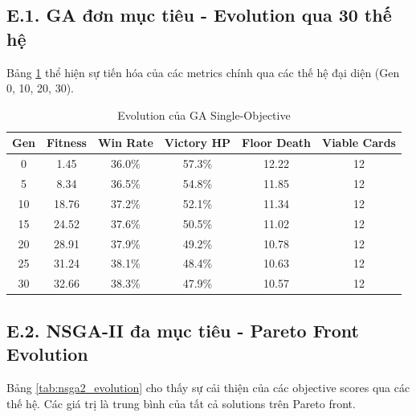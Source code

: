 \subsection*{E.1. GA đơn mục tiêu - Evolution qua 30 thế hệ}

Bảng \ref{tab:ga_evolution} thể hiện sự tiến hóa của các metrics chính qua các thế hệ đại diện (Gen 0, 10, 20, 30).

\begin{table}[H]
    \centering
    \caption{Evolution của GA Single-Objective}
    \label{tab:ga_evolution}
    \begin{tabular}{c c c c c c}
        \toprule
        \textbf{Gen} & \textbf{Fitness} & \textbf{Win Rate} & \textbf{Victory HP} & \textbf{Floor Death} & \textbf{Viable Cards} \\
        \midrule
        0  & 1.45  & 36.0\% & 57.3\% & 12.22 & 12 \\
        5  & 8.34  & 36.5\% & 54.8\% & 11.85 & 12 \\
        10 & 18.76 & 37.2\% & 52.1\% & 11.34 & 12 \\
        15 & 24.52 & 37.6\% & 50.5\% & 11.02 & 12 \\
        20 & 28.91 & 37.9\% & 49.2\% & 10.78 & 12 \\
        25 & 31.24 & 38.1\% & 48.4\% & 10.63 & 12 \\
        30 & 32.66 & 38.3\% & 47.9\% & 10.57 & 12 \\
        \bottomrule
    \end{tabular}
\end{table}

\subsection*{E.2. NSGA-II đa mục tiêu - Pareto Front Evolution}

Bảng \ref{tab:nsga2_evolution} cho thấy sự cải thiện của các objective scores qua các thế hệ. Các giá trị là trung bình của tất cả solutions trên Pareto front.

